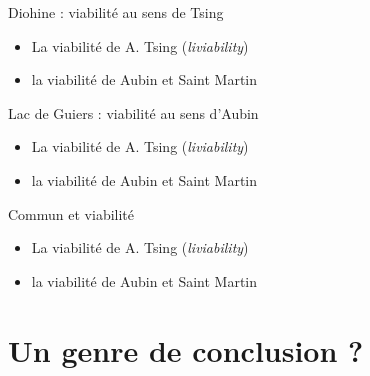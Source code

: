 \documentclass[newPxFont]{beamer}
\begin{document}
\begin{frame}[c]{Diohine : viabilité au sens de Tsing}
    \vspace{-1cm}
    \begin{itemize}
      \item La viabilité de A. Tsing (\textit{liviability})
      \item la viabilité de Aubin et Saint Martin
    \end{itemize}
  
  
\end{frame}

\begin{frame}[c]{Lac de Guiers : viabilité au sens  d'Aubin}
      \vspace{-1cm}
      \begin{itemize}
        \item La viabilité de A. Tsing (\textit{liviability})
        \item la viabilité de Aubin et Saint Martin
      \end{itemize}
    
    
\end{frame}

\begin{frame}[c]{Commun et viabilité}
  \vspace{-1cm}
  \begin{itemize}
    \item La viabilité de A. Tsing (\textit{liviability})
    \item la viabilité de Aubin et Saint Martin
  \end{itemize}


\end{frame}


\section{Un genre de conclusion ?}
\end{document}
